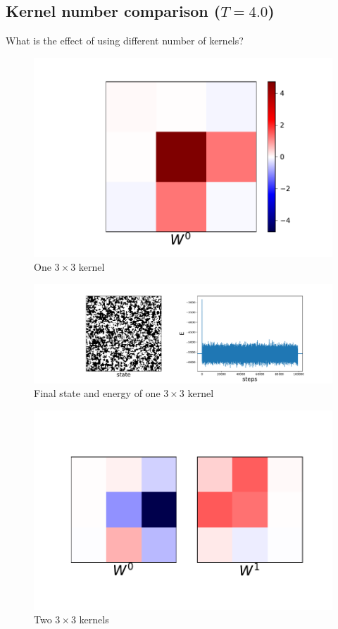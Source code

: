 \documentclass[12pt, two sided]{article}
\begin{document}
\subsection{Kernel number comparison ($T=4.0$)}

What is the effect of using different number of kernels?

\begin{figure}[h!]
\includegraphics[width=\textwidth]{../figures/T_4.0_kernelDims_1-3_no_symmetries.pdf}
\caption{One $3\times3$ kernel}
\end{figure}

\begin{figure}[h!]
\includegraphics[width=\textwidth]{../figures/L_100_T_4.0_kernelDims_1-3_no_symmetries.pdf}
\caption{Final state and energy of one $3\times3$ kernel}
\end{figure}

\begin{figure}[h!]
\includegraphics[width=\textwidth]{../figures/T_4.0_kernelDims_2-3_no_symmetries.pdf}
\caption{Two $3\times3$ kernels}
\end{figure}
\end{document}
